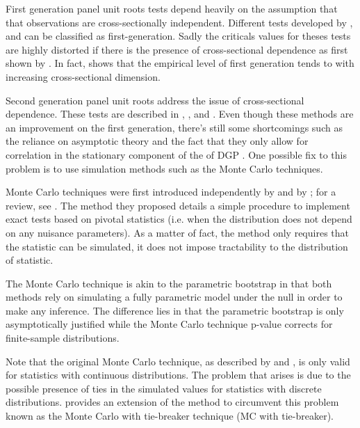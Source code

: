 \documentclass[12pt]{article}\usepackage[]{graphicx}\usepackage[]{color}
\begin{document}
First generation panel unit roots tests depend heavily on the assumption that that observations are cross-sectionally independent. Different tests developed by \cite{breitung_local_2001}, \cite{levin_unit_2002} and \cite{maddala_comparative_1999} can be classified as first-generation. Sadly the criticals values for theses tests are highly distorted if there is the presence of cross-sectional dependence as first shown by \cite{oconnell_overvaluation_1998}. In fact, \cite{lyhagen_why_2008} shows that the empirical level of first generation tends to with increasing cross-sectional dimension.


Second generation panel unit roots address the issue of cross-sectional dependence. These tests are described in \cite{bai_estimating_2004}, \cite{chang_nonlinear_2002}, \cite{choi_unit_2001} and \cite{moon_testing_2004}. Even though these methods are an improvement on the first generation, there's still some shortcomings such as the reliance on asymptotic theory and the fact that they only allow for correlation in the stationary component of the of DGP \cite{Wagner2008}. One possible fix to this problem is to use simulation methods such as the Monte Carlo techniques.


Monte Carlo techniques were first introduced independently by \cite{dwass_modified_1957} and by \cite{barnard_comment_1963}; for a review, see \cite{dufour_monte_2003}. The method they proposed details a simple procedure to implement exact tests based on pivotal statistics (i.e. when the distribution does not depend on any nuisance parameters). As a matter of fact, the method only requires that the statistic can be simulated, it does not impose tractability to the distribution of statistic. 

The Monte Carlo technique is akin to the parametric bootstrap in that both methods rely on simulating a fully parametric model under the null in order to make any inference. The difference lies in that the parametric bootstrap is only asymptotically justified while the Monte Carlo technique p-value corrects for finite-sample distributions. 

Note that the original Monte Carlo technique, as described by \cite{dwass_modified_1957} and \cite{barnard_comment_1963}, is only valid for statistics with continuous distributions. The problem that arises is due to the possible presence of ties in the simulated values for statistics with discrete distributions. \cite{dufour_monte_2006} provides an extension of the method to circumvent this problem known as the Monte Carlo with tie-breaker technique (MC with tie-breaker). 
\end{document}

